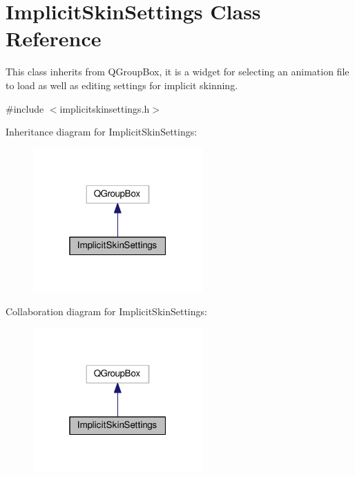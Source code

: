 \hypertarget{classImplicitSkinSettings}{}\section{Implicit\+Skin\+Settings Class Reference}
\label{classImplicitSkinSettings}


This class inherits from Q\+Group\+Box, it is a widget for selecting an animation file to load as well as editing settings for implicit skinning.  




{\ttfamily \#include $<$implicitskinsettings.\+h$>$}



Inheritance diagram for Implicit\+Skin\+Settings\+:\nopagebreak
\begin{figure}[H]
\begin{center}
\leavevmode
\includegraphics[width=184pt]{d0/ddd/classImplicitSkinSettings__inherit__graph}
\end{center}
\end{figure}


Collaboration diagram for Implicit\+Skin\+Settings\+:\nopagebreak
\begin{figure}[H]
\begin{center}
\leavevmode
\includegraphics[width=184pt]{d2/d88/classImplicitSkinSettings__coll__graph}
\end{center}
\end{figure}
